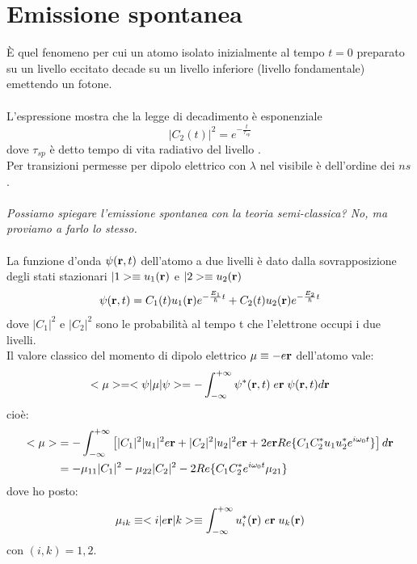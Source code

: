 \section{Emissione spontanea}
È quel fenomeno per cui un atomo isolato inizialmente al tempo $t=0$ preparato su un livello eccitato  decade su un livello inferiore  (livello fondamentale) emettendo un fotone.\\
\\
L'espressione mostra che la legge di decadimento è esponenziale
\begin{equation*}
|C_2(t)|^2 = e^{-\frac{t}{\tau_{sp}}}
\end{equation*}
dove $\tau_{sp}$ è detto tempo di vita radiativo del livello .\\
Per transizioni permesse per dipolo elettrico con $\lambda$ nel visibile è dell'ordine dei $ns$.\\
\\
\textit{Possiamo spiegare l'emissione spontanea con la teoria semi-classica? No, ma proviamo a farlo lo stesso.}\\
\\
La funzione d'onda $\psi(\mathbf{r}, t)$ dell'atomo a due livelli è dato dalla sovrapposizione degli stati stazionari $|1> \equiv u_1(\mathbf{r})$ e $|2> \equiv u_2(\mathbf{r})$
\begin{equation*}
\psi(\mathbf{r}, t) = C_1(t) u_1(\mathbf{r}) e^{-\frac{E_1}{\hbar}t} + C_2(t) u_2(\mathbf{r}) e^{-\frac{E_2}{\hbar}t}
\end{equation*}
dove $|C_1|^2$ e $|C_2|^2$ sono le probabilità al tempo t che l'elettrone occupi i due livelli.\\
Il valore classico del momento di dipolo elettrico $\mathbf{\mu} \equiv -e\mathbf{r}$ dell'atomo vale:
\begin{equation*}
<\mathbf{\mu}> = <\psi|\mathbf{\mu}|\psi> = -\int_{-\infty}^{+\infty} \psi^*(\mathbf{r}, t) \; e\mathbf{r} \; \psi(\mathbf{r}, t) d\mathbf{r}
\end{equation*}
cioè:
\begin{align}
    <\mathbf{\mu}> &= - \int_{-\infty}^{+\infty} \left[|C_1|^2 |u_1|^2 e \mathbf{r} + |C_2|^2 |u_2|^2 e \mathbf{r} + 2 e \mathbf{r} Re\{C_1 C_2^* u_1 u_2^* e^{i\omega_0t}\} \right] d\mathbf{r}\\
    &= - \mathbf{\mu}_{11}|C_1|^2 - \mathbf{\mu}_{22} |C_2|^2 - 2 Re\{C_1 C_2^* e^{i\omega_0 t} \mathbf{\mu}_{21}\}
\end{align}
dove ho posto:
\begin{equation}
    \mathbf{\mu}_{ik} \equiv <i| e\mathbf{r} |k> \equiv \int_{-\infty}^{+\infty} u_i^*(\mathbf{r}) \; e\mathbf{r} \; u_k(\mathbf{r})
\end{equation}
con $(i, k) = 1,2$.

